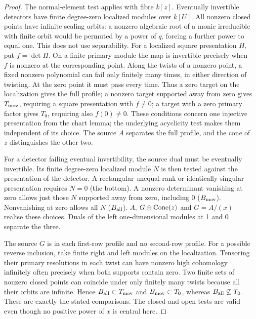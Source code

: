 \documentclass[11pt]{article}
\begin{document}
\begin{proof}
The normal-element test applies with fibre $k[z]$. Eventually invertible
detectors have finite degree-zero localized modules over $k[U]$. All
nonzero closed points have infinite scaling orbits: a nonzero algebraic
root of a monic irreducible with finite orbit would be permuted by a
power of $q$, forcing a further power to equal one. This does not use
separability. For a localized square presentation $H$, put $f=\det H$.
On a finite primary module the map is invertible precisely when $f$
is nonzero at the corresponding point. Along the twists of a nonzero
point, a fixed nonzero polynomial can fail only finitely many times,
in either direction of twisting. At the zero point it must pass every
time. Thus a zero target on the localization gives the full profile;
a nonzero target supported away from zero gives $T_{\rm mov}$, requiring
a square presentation with $f\ne0$; a target with a zero primary factor
gives $T_0$, requiring also $f(0)\ne0$. These conditions concern one
injective presentation from the chart lemma; the underlying acyclicity
test makes them independent of its choice. The source $A$ separates
the full profile, and the cone of $z$ distinguishes the other two.

For a detector failing eventual invertibility, the source dual must
be eventually invertible. Its finite degree-zero localized module $N$
is then tested against the presentation of the detector. A rectangular
unequal-rank or identically singular presentation requires $N=0$
(the bottom). A nonzero determinant vanishing at zero allows just those
$N$ supported away from zero, including $0$ ($B_{\rm mov}$).
Nonvanishing at zero allows all $N$ ($B_{\rm all}$). $A$, $G\oplus
\operatorname{Cone}(z)$ and $G=A/(x)$ realise these choices. Duals of the left
one-dimensional modules at 1 and 0 separate the three.

The source $G$ is in each first-row profile and no second-row profile.
For a possible reverse inclusion, take finite right and left modules
on the localization. Tensoring their primary resolutions in each twist
can have nonzero high cohomology infinitely often precisely when
both supports contain zero. Two finite sets of nonzero closed points
can coincide under only finitely many twists because all their orbits
are infinite. Hence $B_{\rm all}\subset T_{\rm mov}$ and
$B_{\rm mov}\subset T_0$, whereas $B_{\rm all}\not\subseteq T_0$.
These are exactly the stated comparisons. The closed and open tests are
valid even though no positive power of $x$ is central here.
\end{proof}
\end{document}
